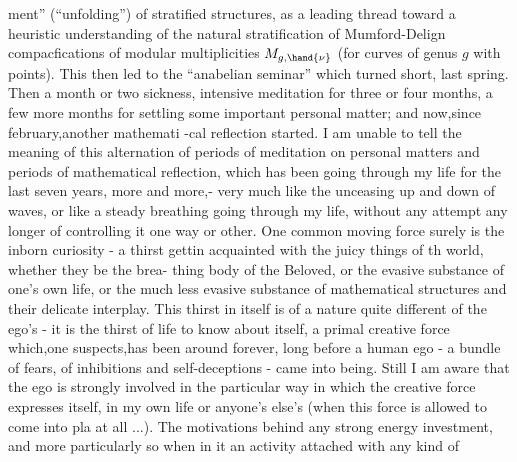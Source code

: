 
ment'' (``unfolding'') of stratified structures,  as a leading thread toward
a heuristic understanding of the natural stratification of  Mumford-Delign
compacfications of modular multiplicities $M_{g,\hand{\nu}}$ (for curves of genus $g$
 with \hand{$\nu$} points).  This then led to the ``anabelian seminar'' which
 turned short,  last spring.  Then a month or two sickness,  intensive
meditation  for three or four months,  a few more months for settling
some important personal matter;  and now,since february,another mathemati%
-cal reflection started. \hand{$\rfloor$}I  am unable to tell the meaning of this
alternation of periods of meditation on personal matters and periods of
mathematical reflection,  which has been going through my life for the
last seven years,  more and more,- very much like the unceasing
up and down of waves,  or like a steady breathing going through my life,
without any attempt any longer of controlling it one way or other.  One
common moving force surely is the inborn curiosity  -  a thirst  gettin
acquainted with the juicy things of th  world,  whether they be the brea-%
thing body of the Beloved,  or the evasive substance of one's own life,
or the much less evasive substance of mathematical structures and their
delicate interplay.  This thirst in itself is of a nature quite different
of the ego's  -  it is the thirst of life to know about itself,  a primal
creative force which,one suspects,has been around forever,  long before
a human ego  -  a bundle  of fears,  of inhibitions and self-deceptions -
came into being.  Still I am aware that the ego is strongly involved in
the particular way in which the creative force expresses itself,  in my
own life or anyone's else's (when this force is allowed to come into pla
at all ...).  The motivations behind any strong energy investment,  and
more particularly so when in it  an activity attached with any kind of
